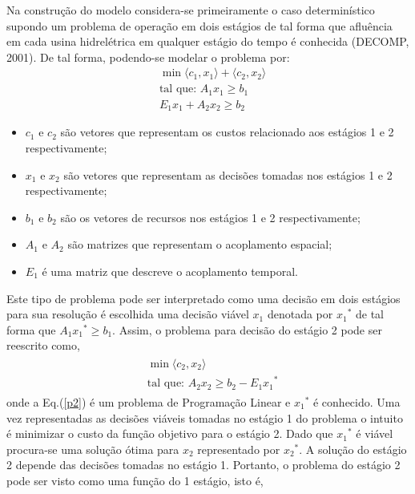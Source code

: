 \documentclass[12pt,fleqn]{article}
\begin{document}
Na constru\c c\~ao do modelo considera-se primeiramente o caso determin\'istico supondo um problema de opera\c
c\~ao em dois est\'agios de tal forma que 
aflu\^encia em cada usina hidrel\'etrica em qualquer est\'agio do tempo \'e conhecida (DECOMP, 2001). De tal forma,
podendo-se modelar o problema por:
\begin{align}
&\min \langle c_1,x_1\rangle + \langle c_2,x_2\rangle \nonumber \\
&\mbox{tal que: }	A_1 x_1 \geq b_1 \\
&E_1 x_1 + A_2 x_2 \geq b_2 \nonumber
\label{p1}
\end{align}
\begin{itemize}[itemsep=-2pt]
  \item $c_1$ e $c_2$ s\~ao vetores que representam os custos relacionado aos est\'agios 1 e 2 respectivamente;
  \item $x_1$ e $x_2$ s\~ao vetores que representam as decis\~oes tomadas nos est\'agios 1 e 2 respectivamente;
  \item $b_1$ e $b_2$  s\~ao os vetores de recursos nos est\'agios 1 e 2 respectivamente;   \item $A_1$ e $A_2$ s\~ao matrizes que representam o acoplamento espacial;
  \item $E_1$ \'e uma matriz que descreve o acoplamento temporal.
\end{itemize}
Este tipo de problema pode ser interpretado como uma decis\~ao em dois est\'agios para sua resolu\c c\~ao \'e
escolhida uma decis\~ao vi\'avel $x_1$ denotada por ${x_1}^{*}$ de tal forma que $A_1{x_1}^{*} \geq b_1$. 
Assim, o problema para decis\~ao do est\'agio 2 pode ser reescrito como, 
\begin{align}
    \label{p2}
  \begin{split}	
 & 	\min \langle c_2,x_2\rangle  \\
&\mbox{tal que: }A_2 x_2 \geq b_2 -{E_1 x_1}^{*}  
  \end{split}
\end{align}
onde a Eq.(\ref {p2}) \'e um problema de Programa\c c\~ao Linear e ${x_1}^{*}$ \'e conhecido. Uma vez representadas as decis\~oes vi\'aveis tomadas no est\'agio 1 do
problema o intuito \'e minimizar o custo da fun\c c\~ao objetivo para o est\'agio 2. Dado que ${x_1}^{*}$ \'e vi\'avel procura-se uma solu\c c\~ao \'otima para $x_2$ representado por
${x_2}^{*}$. A solu\c c\~ao do est\'agio 2 depende das decis\~oes tomadas no est\'agio 1. Portanto, o
problema do est\'agio 2 pode ser visto como uma fun\c c\~ao do 1 est\'agio, isto \'e,
\end{document}
